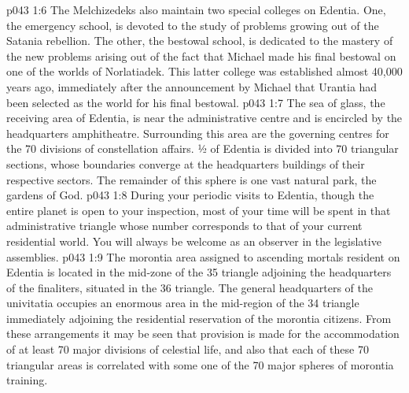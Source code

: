 \vs p043 1:6 The Melchizedeks also maintain two special colleges on Edentia. One, the emergency school, is devoted to the study of problems growing out of the Satania rebellion. The other, the bestowal school, is dedicated to the mastery of the new problems arising out of the fact that Michael made his final bestowal on one of the worlds of Norlatiadek. This latter college was established almost 40,000 years ago, immediately after the announcement by Michael that Urantia had been selected as the world for his final bestowal.
\vs p043 1:7 \pc The sea of glass, the receiving area of Edentia, is near the administrative centre and is encircled by the headquarters amphitheatre. Surrounding this area are the governing centres for the 70 divisions of constellation affairs. ½ of Edentia is divided into 70 triangular sections, whose boundaries converge at the headquarters buildings of their respective sectors. The remainder of this sphere is one vast natural park, the gardens of God.
\vs p043 1:8 During your periodic visits to Edentia, though the entire planet is open to your inspection, most of your time will be spent in that administrative triangle whose number corresponds to that of your current residential world. You will always be welcome as an observer in the legislative assemblies.
\vs p043 1:9 The morontia area assigned to ascending mortals resident on Edentia is located in the mid\hyp{}zone of the 35 triangle adjoining the headquarters of the finaliters, situated in the 36 triangle. The general headquarters of the univitatia occupies an enormous area in the mid\hyp{}region of the 34 triangle immediately adjoining the residential reservation of the morontia citizens. From these arrangements it may be seen that provision is made for the accommodation of at least 70 major divisions of celestial life, and also that each of these 70 triangular areas is correlated with some one of the 70 major spheres of morontia training.
